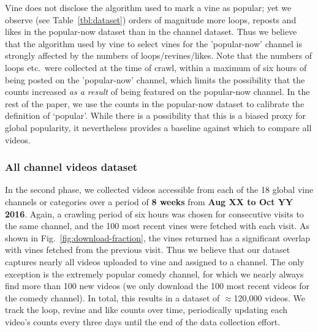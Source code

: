 Vine does not disclose the algorithm used to mark a vine as popular; yet we observe (see Table~\ref{tbl:dataset}) orders of magnitude more loops, reposts and likes in the popular-now dataset than in the channel dataset. Thus we believe that the algorithm used by vine to select vines for the 'popular-now' channel is strongly affected by the numbers of loops/revines/likes. Note that the numbers of loops etc.\ were collected at the time of crawl, within a maximum of six hours of being posted on the 'popular-now' channel, which limits the possibility that the counts increased \emph{as a result} of being featured on the popular-now channel. In the rest of the paper, we use the counts in the popular-now dataset to calibrate the definition of `popular'. While there is a possibility that this is a biased proxy for global popularity, it nevertheless provides a baseline against which to compare all videos.

\subsubsection{All channel videos dataset}


In the second phase, we collected 
videos accessible from each of the 18 global vine channels or categories%
 over a period of \textbf{8 weeks} from \textbf{Aug XX to Oct YY  2016}. Again, a crawling period of six hours was chosen for consecutive visits to the same channel, and the 100 most recent vines were fetched with each visit. As shown in Fig.~\ref{fig:download-fraction}, the  vines returned has a significant overlap with vines fetched from the previous visit. Thus we believe that our dataset captures nearly all videos uploaded to vine and assigned to a channel. The only exception is the extremely popular comedy channel, for which we nearly always find more than 100 new videos (we only download the 100 most recent videos for the comedy channel). In total, this results in a dataset of $\approx$120,000 videos. We track the loop, revine and like counts   over time, periodically updating each video's counts every three days until the end of the data collection effort.
  
